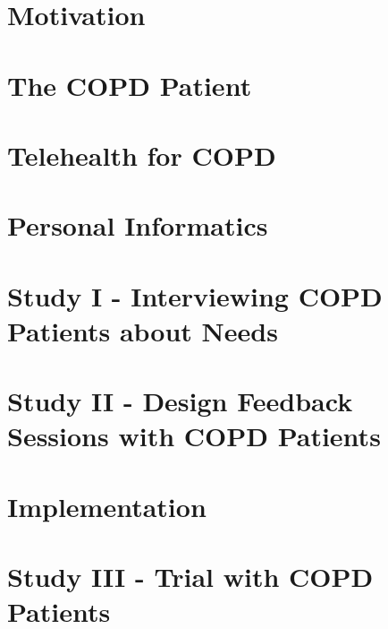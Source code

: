 
\usepackage{booktabs} %


\cleardoublepage
\cleardoublepage

\cleardoublepage

\begin{KeepFromToc}
	\tableofcontents
\end{KeepFromToc}

\chapter{Motivation}



\chapter{The COPD Patient}


\chapter{Telehealth for COPD}





\chapter{Personal Informatics}



\chapter{Study I - Interviewing COPD Patients about Needs} 



\chapter{Study II - Design Feedback Sessions with COPD Patients}


\chapter{Implementation}



\chapter{Study III - Trial with COPD Patients}



